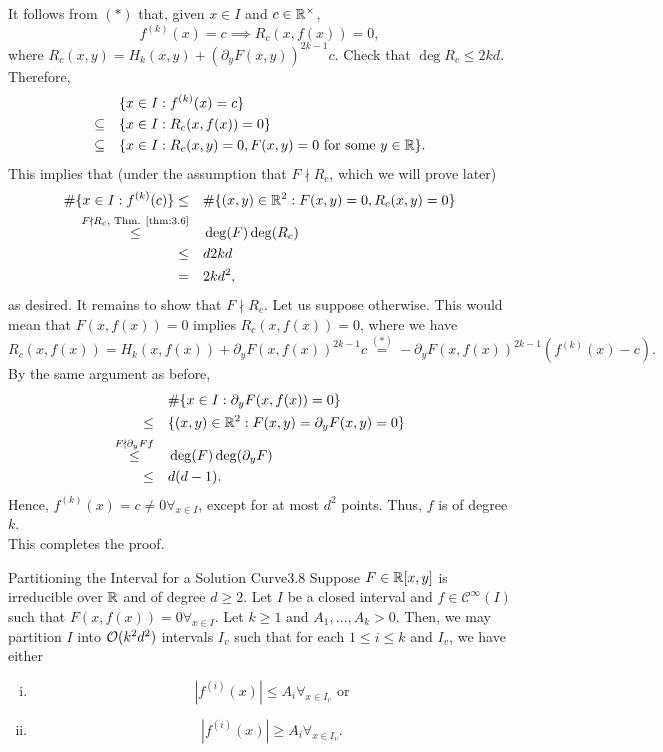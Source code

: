 \documentclass{Vorlesungstemplate_English} %
\begin{document}
\begin{pf}
  It follows from $(*)$ that, given $x \in I$ and $c \in \mathbb{R}^{\times}$,
  \[ f^{(k)}(x) = c \implies R_c(x,f(x)) = 0,\]
  where $R_c(x,y) = H_k(x,y) + (\partial_yF(x,y))^{2k-1}c$. Check that $\deg R_c \leq 2kd$. Therefore,
  \begin{align*}
    & \{ x \in I: f^{(k)}(x) = c\} \\
    \subseteq \quad & \{ x \in I: R_c(x,f(x)) = 0\} \\
    \subseteq \quad & \{ x \in I: R_c(x,y) = 0, F(x,y) = 0 \text{ for some } y \in \mathbb{R}\}.
  \end{align*}
  This implies that (under the assumption that $F \nmid R_c$, which we will prove later)
  \begin{align*}
    \#\{ x \in I: f^{(k)}(c)\} \leq \quad & \#\{ (x,y) \in \mathbb{R}^2: F(x,y) = 0, R_c(x,y) = 0\} \\
    \stackrel{F \nmid R_c, \text{ Thm. \ref{thm:3.6}} }{\leq} \quad & \deg(F)\deg(R_c) \\
    \leq \quad & d2kd \\
    = \quad & 2kd^2,
  \end{align*}
  as desired. It remains to show that $F \nmid R_c$. Let us suppose otherwise. This would mean that $F(x,f(x)) = 0$ implies $R_c(x,f(x)) = 0$, where we have
  \[ R_c(x,f(x)) = H_k(x,f(x)) + \partial_yF(x,f(x))^{2k-1}c \stackrel{(*)}{=} -\partial_yF(x,f(x))^{2k-1}(f^{(k)}(x)-c).\]
  By the same argument as before,
  \begin{align*}
    & \#\{ x \in I: \partial_yF(x,f(x)) = 0\} \\
    \leq \quad & \{ (x,y) \in \mathbb{R}^2: F(x,y) = \partial_yF(x,y) = 0\} \\
    \stackrel{F \nmid \partial_yFf}{\leq} \quad & \deg(F)\deg(\partial_yF) \\
    \leq \quad & d(d-1).
  \end{align*}
  Hence, $f^{(k)}(x) = c \neq 0 \forall_{x \in I}$, except for at most $d^2$ points. Thus, $f$ is of degree $k$. \Lightning \\
  This completes the proof.
\end{pf}
\begin{lemma}{Partitioning the Interval for a Solution Curve}{3.8}
  Suppose $F \in \mathbb{R}[x,y]$ is irreducible over $\mathbb{R}$ and of degree $d \geq 2$. Let $I$ be a closed interval and $f \in \mathcal{C}^{\infty}(I)$ such that $F(x,f(x)) = 0 \forall_{x \in I}$. Let $k \geq 1$ and $A_1, \dots, A_k > 0$. Then, we may partition $I$ into $\mathcal{O}(k^2d^2)$ intervals $I_v$ such that for each $1 \leq i \leq k$ and $I_v$, we have either
  \begin{enumerate}[(i)]
    \item \[ \left|f^{(i)}(x)\right| \leq A_i \forall_{x \in I_v} \text{ or}\]
    \item{\[ \left|f^{(i)}(x)\right| \geq A_i \forall_{x \in I_v}.\]}
  \end{enumerate}
\end{lemma}
\end{document}
